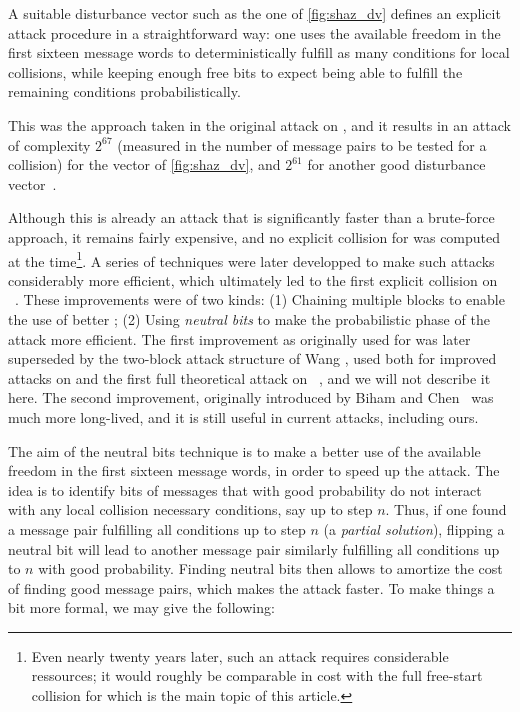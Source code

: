 A suitable disturbance vector such as the one of \autoref{fig:shaz_dv} defines an explicit attack procedure in a straightforward way: one uses the available freedom in the first
sixteen message words to deterministically fulfill as many conditions for local collisions, while keeping enough free bits to expect being able to fulfill the remaining conditions
probabilistically.

This was the approach taken in the original attack on \shazero, and it results in an attack of complexity $2^{67}$ (measured in the number of message pairs to be tested for a collision)
for the vector of \autoref{fig:shaz_dv}, and $2^{61}$ for another good disturbance vector~\cite{DBLP:conf/crypto/ChabaudJ98}.

Although this is already an attack that is significantly faster than a brute-force approach, it remains fairly expensive, and no explicit collision for \shazero was computed at the time\footnote{Even
nearly twenty years later, such an attack requires considerable ressources; it would roughly be comparable in cost with the full free-start collision for \shaone which is the main topic of
this article.}.
A series of techniques were later developped to make such attacks considerably more efficient, which ultimately led to the first explicit collision on \shazero~\cite{DBLP:conf/eurocrypt/BihamCJCLJ05}.
These improvements were of two kinds: (1) Chaining multiple blocks to enable the use of better \dvs; (2) Using \emph{neutral bits} to make the probabilistic phase of the attack more efficient.
The first improvement as originally used for \shazero was later superseded by the two-block attack structure of Wang \etal, used both for improved attacks on \shazero
and the first full theoretical attack on \shaone~\cite{DBLP:conf/crypto/WangYY05,DBLP:conf/crypto/WangYY05a},
and we will not describe it here. The second improvement,
originally introduced by Biham and Chen~\cite{DBLP:conf/crypto/BihamC04} was much more long-lived, and it is still useful in current attacks, including ours.

The aim of the neutral bits technique is to make a better use of the available freedom in the first sixteen message words, in order to speed up the attack. The idea is to identify bits
of messages that with good probability do not interact with any local collision necessary conditions, say up to step $n$. Thus, if one found a message pair fulfilling all conditions
up to step $n$ (a \emph{partial solution}), flipping a neutral bit will lead to another message pair similarly fulfilling all conditions up to $n$ with good probability. Finding neutral bits then allows to amortize
the cost of finding good message pairs, which makes the attack faster. To make things a bit more formal, we may give the following:

